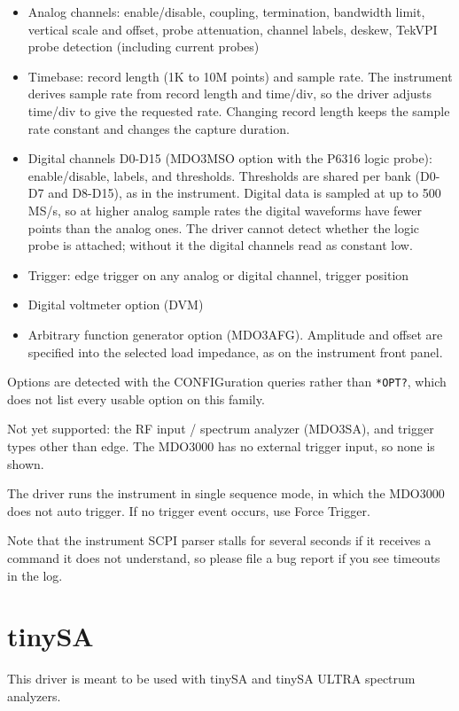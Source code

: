 \begin{itemize}
\item Analog channels: enable/disable, coupling, termination, bandwidth limit, vertical scale and offset, probe
attenuation, channel labels, deskew, TekVPI probe detection (including current probes)
\item Timebase: record length (1K to 10M points) and sample rate. The instrument derives sample rate from record length
and time/div, so the driver adjusts time/div to give the requested rate. Changing record length keeps the sample rate
constant and changes the capture duration.
\item Digital channels D0-D15 (MDO3MSO option with the P6316 logic probe): enable/disable, labels, and thresholds.
Thresholds are shared per bank (D0-D7 and D8-D15), as in the instrument. Digital data is sampled at up to 500 MS/s,
so at higher analog sample rates the digital waveforms have fewer points than the analog ones. The driver cannot
detect whether the logic probe is attached; without it the digital channels read as constant low.
\item Trigger: edge trigger on any analog or digital channel, trigger position
\item Digital voltmeter option (DVM)
\item Arbitrary function generator option (MDO3AFG). Amplitude and offset are specified into the selected load
impedance, as on the instrument front panel.
\end{itemize}

Options are detected with the CONFIGuration queries rather than \texttt{*OPT?}, which does not list every usable
option on this family.

Not yet supported: the RF input / spectrum analyzer (MDO3SA), and trigger types other than edge. The MDO3000 has no external trigger input, so none is shown.

The driver runs the instrument in single sequence mode, in which the MDO3000 does not auto trigger. If no trigger
event occurs, use Force Trigger.

Note that the instrument SCPI parser stalls for several seconds if it receives a command it does not understand, so
please file a bug report if you see timeouts in the log.

\section{tinySA}

This driver is meant to be used with tinySA and tinySA ULTRA spectrum analyzers.

